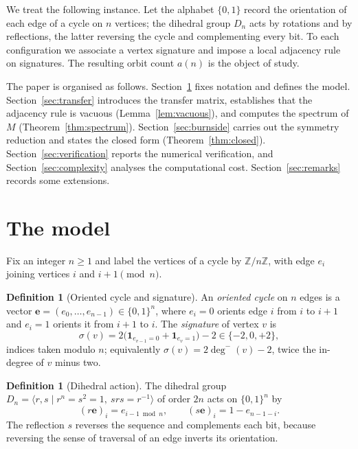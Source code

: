 \documentclass[11pt,a4paper]{article}
\theoremstyle{plain}
\theoremstyle{definition}
\newtheorem{definition}[theorem]{Definition}
\theoremstyle{remark}
\newcommand{\Z}{\mathbb{Z}}
\newcommand{\Dih}{D_{n}}
\numberwithin{equation}{section}
\begin{document}
We treat the following instance. Let the alphabet $\{0,1\}$ record the
orientation of each edge of a cycle on $n$ vertices; the dihedral group
$\Dih$ acts by rotations and by reflections, the latter reversing the
cycle and complementing every bit. To each configuration we associate a
vertex signature and impose a local adjacency rule on signatures. The
resulting orbit count $a(n)$ is the object of study.

The paper is organised as follows. Section~\ref{sec:model} fixes
notation and defines the model. Section~\ref{sec:transfer} introduces the
transfer matrix, establishes that the adjacency rule is vacuous
(Lemma~\ref{lem:vacuous}), and computes the spectrum of $M$
(Theorem~\ref{thm:spectrum}). Section~\ref{sec:burnside} carries out the
symmetry reduction and states the closed form
(Theorem~\ref{thm:closed}). Section~\ref{sec:verification} reports the
numerical verification, and Section~\ref{sec:complexity} analyses the
computational cost. Section~\ref{sec:remarks} records some extensions.

\section{The model}\label{sec:model}

Fix an integer $n\ge 1$ and label the vertices of a cycle by
$\Z/n\Z$, with edge $e_i$ joining vertices $i$ and $i+1\pmod n$.

\begin{definition}[Oriented cycle and signature]\label{def:cycle}
An \emph{oriented cycle} on $n$ edges is a vector
$\mathbf e=(e_0,\dots,e_{n-1})\in\{0,1\}^{n}$, where $e_i=0$ orients edge
$i$ from $i$ to $i+1$ and $e_i=1$ orients it from $i+1$ to $i$. The
\emph{signature} of vertex $v$ is
\begin{equation}\label{eq:sig}
\sigma(v)=2\bigl(\mathbf 1_{e_{v-1}=0}+\mathbf 1_{e_v=1}\bigr)-2\in\{-2,0,+2\},
\end{equation}
indices taken modulo $n$; equivalently $\sigma(v)=2\deg^-(v)-2$, twice
the in-degree of $v$ minus two.
\end{definition}

\begin{definition}[Dihedral action]\label{def:action}
The dihedral group $\Dih=\langle r,s\mid r^{n}=s^{2}=1,\ srs=r^{-1}\rangle$
of order $2n$ acts on $\{0,1\}^{n}$ by
\[
(r\mathbf e)_i=e_{i-1\bmod n},\qquad (s\mathbf e)_i=1-e_{n-1-i}.
\]
The reflection $s$ reverses the sequence and complements each bit, because
reversing the sense of traversal of an edge inverts its orientation.
\end{definition}
\end{document}
